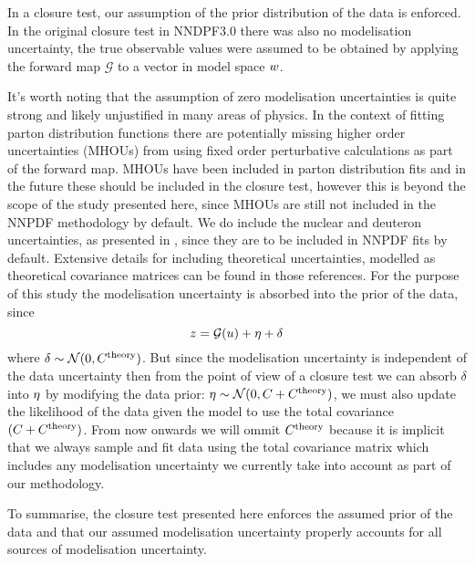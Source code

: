 In a closure test,
our assumption of the prior distribution of the data is enforced. In the original
closure test in NNDPF3.0 there was also no modelisation uncertainty, the true
observable values were assumed to be obtained by applying the forward map
$\mathcal G$ to a vector in model space $w$.

It's worth noting that the assumption of zero modelisation uncertainties is
quite strong and likely unjustified in many areas of physics. In the context of
fitting parton distribution functions there are potentially missing higher
order uncertainties (MHOUs) from
using fixed order perturbative calculations as part of the forward map.
MHOUs have been included in parton distribution fits \cite{AbdulKhalek:2019ihb}
and in the future these should be included in the closure test, however this
is beyond the scope of the study presented here, since MHOUs are still not
included in the NNPDF methodology by default. We do include the nuclear and
deuteron uncertainties, as presented in \cite{Ball:2018twp, Ball:2020xqw},
since they are to be included in NNPDF fits by default. Extensive
details for including theoretical uncertainties, modelled as theoretical covariance
matrices can be found in those references. For the purpose of this study the
modelisation uncertainty is absorbed into the prior of the data, since
\begin{equation}
    z = \mathcal{G}(u) + \eta + \delta
\end{equation}
where $\delta \sim \mathcal{N}(0, C^{\rm theory})$. But since the
modelisation uncertainty is independent of the data uncertainty then from the
point of view of a closure test we can absorb $\delta$ into $\eta$ by
modifying the data prior: $\eta \sim \mathcal{N}(0, C + C^{\rm theory})$,
we must
also update the likelihood of the data given the model to use the total
covariance $(C + C^{\rm theory})$. From now onwards we will ommit
$C^{\rm theory}$ because it is implicit that we always sample and fit data
using the total covariance matrix which includes any modelisation uncertainty
we currently take into account as part of our methodology.

To summarise, the closure test presented here enforces the assumed prior of the
data and that our assumed modelisation uncertainty properly accounts
for all sources of modelisation uncertainty.
